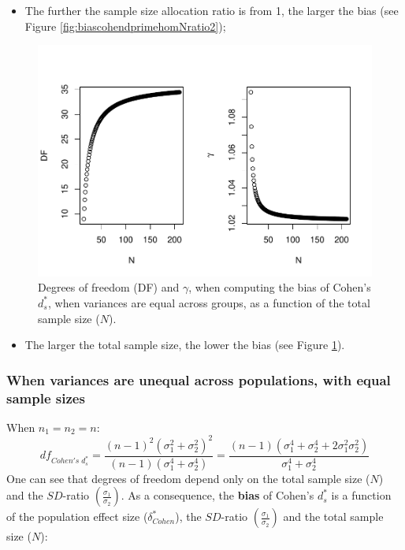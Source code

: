 \documentclass[
  english,
  man,mask]{apa6}
\providecommand{\tightlist}{%
  \setlength{\itemsep}{0pt}\setlength{\parskip}{0pt}}
\begin{document}
\begin{itemize}
\tightlist
\item
  The further the sample size allocation ratio is from 1, the larger the bias (see Figure \ref{fig:biascohendprimehomNratio2});
\end{itemize}

\begin{figure}
\centering
\includegraphics{Theoretical-Bias-of-all-estimators-as-a-function-of-population-parameters_files/figure-latex/biascohendprimehomNsize2-1.pdf}
\caption{\label{fig:biascohendprimehomNsize2}Degrees of freedom (DF) and \(\gamma\), when computing the bias of Cohen's \(d^*_s\), when variances are equal across groups, as a function of the total sample size (\(N\)).}
\end{figure}

\begin{itemize}
\tightlist
\item
  The larger the total sample size, the lower the bias (see Figure \ref{fig:biascohendprimehomNsize2}).
\end{itemize}

\hypertarget{when-variances-are-unequal-across-populations-with-equal-sample-sizes}{%
\subsubsection{When variances are unequal across populations, with equal sample sizes}\label{when-variances-are-unequal-across-populations-with-equal-sample-sizes}}

When \(n_1 = n_2 = n\):
\[df_{Cohen's \; d^*_s} = \frac{(n-1)^2(\sigma^2_1+\sigma^2_2)^2}{(n-1)(\sigma^4_1+\sigma^4_2)} =  \frac{(n-1)(\sigma^4_1+\sigma^4_2+2\sigma^2_1\sigma^2_2)}{\sigma^4_1+\sigma^4_2}\]
One can see that degrees of freedom depend only on the total sample size (\(N\)) and the \(SD\)-ratio \(\left( \frac{\sigma_1}{\sigma_2}\right)\). As a consequence, the \textbf{bias} of Cohen's \(d^*_s\) is a function of the population effect size (\(\delta^*_{Cohen}\)), the \(SD\)-ratio \(\left( \frac{\sigma_1}{\sigma_2}\right)\) and the total sample size (\(N\)):
\end{document}
